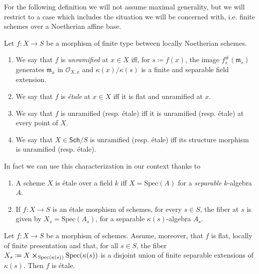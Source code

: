 \noindent
For the following definition we will not assume maximal generality, but
we will restrict to a case which includes the situation we will be concerned with,
i.e. finite schemes over a Noetherian affine base.
\begin{defn}\label{defn:EtaleMorphismSheaves}
	Let $f\colon X \to S$ be a morphism of finite type between
	locally Noetherian schemes.
\begin{enumerate}
	\item We say that $f$ is {\em unramified} at $x \in X$ iff, for $s \coloneqq f(x)$,
		the image $f^{\#}_s(\mathfrak{m}_s)$ generates
		$\mathfrak{m}_x$ in $\mathcal{O}_{ X,x }$
		and $\kappa(x)/\kappa(s)$ is a finite and separable field extension.

	\item We say that $f$ is {\em étale} at $x \in X$ iff it is
		flat and unramified at $x$.

	\item We say that $f$ is unramified (resp$.$ étale) iff it is 
		unramified (resp$.$ étale) at every point of $X$.

	\item We say that $X \in \mathsf{Sch}/S$ is unramified 
		(resp$.$ étale) iff its structure
		morphism is unramified (resp$.$ étale).
\end{enumerate}
\end{defn}


\noindent
In fact we can use this characterization in our context thanks to
\begin{lem}
	\leavevmode\vspace{-.2\baselineskip}
\begin{enumerate}
	\item A scheme $X$ is étale over a field $k$ iff $X = \mathrm{Spec}(A)$
		for a {\em separable} $k$-algebra $A$.
	\item If $f\colon X \to S$ is an étale morphism of schemes,
		for every $s \in S$, the fiber at $s$ is given by $X_s = \mathrm{Spec}(A_s)$,
		for a separable $\kappa(s)$-algebra $A_s$.
\end{enumerate}
\end{lem} 


\begin{lem}
	\label{FlatMorphismEtaleViaFIbers}
	Let $f\colon X \to S$ be a morphism of schemes.
	Assume, moreover, that $f$ is flat, locally of finite presentation and that,
	for all $s \in S$, the fiber $X_s \coloneqq 
	X \cross_{\mathrm{Spec}(\kappa(s))} \mathrm{Spec}(\kappa(s))$
	is a disjoint union of finite separable extensions of $\kappa(s)$.
	Then $f$ is étale.
\end{lem} 


